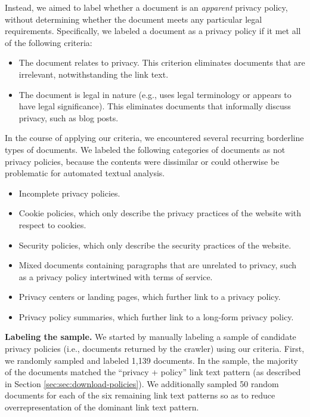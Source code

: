 Instead, we aimed to label whether a document is an \textit{apparent} privacy policy, without determining whether the document meets any particular legal requirements. Specifically, we labeled a document as a privacy policy if it met all of the following criteria:
\begin{itemize}
    \item The document relates to privacy. This criterion eliminates documents that are irrelevant, notwithstanding the link text.
    \item The document is legal in nature (e.g., uses legal terminology or appears to have legal significance). This eliminates documents that informally discuss privacy, such as blog posts.
\end{itemize}
In the course of applying our criteria, we encountered several recurring borderline types of documents. We labeled the following categories of documents as not privacy policies, because the contents were dissimilar or could otherwise be problematic for automated textual analysis.
\begin{itemize}
\item Incomplete privacy policies.

\item Cookie policies, which only describe the privacy practices of the website with respect to cookies.

\item Security policies, which only describe the security practices of the website.

\item Mixed documents containing paragraphs that are unrelated to privacy, such as a privacy policy intertwined with terms of service.

\item Privacy centers or landing pages, which further link to a privacy policy.

\item Privacy policy summaries, which further link to a long-form privacy policy.

\end{itemize}

\textbf{Labeling the sample.} We started by manually labeling a sample of candidate privacy policies (i.e., documents returned by the crawler) using our criteria. First, we randomly sampled and labeled 1,139 documents. In the sample, the majority of the documents 
matched the ``privacy + policy'' link text pattern (as described in Section \ref{sec:sec:download-policies}). We additionally sampled 50 random documents for each of the six remaining link text patterns so as to reduce overrepresentation of the 
dominant
link text pattern.

